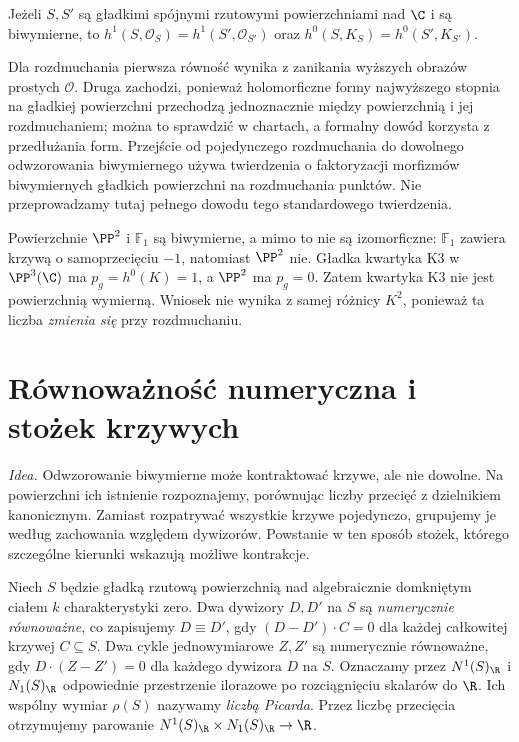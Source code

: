 \begin{twierdzenie}
\label{tw:ga8-q-pg}
Jeżeli $S,S'$ są gładkimi spójnymi rzutowymi
powierzchniami nad $\C$ i są biwymierne, to
$h^1(S,\mathcal O_S)=h^1(S',\mathcal O_{S'})$ oraz
$h^0(S,K_S)=h^0(S',K_{S'})$.
\end{twierdzenie}
\begin{uwaga}
Dla rozdmuchania pierwsza równość wynika z zanikania
wyższych obrazów prostych $\mathcal O$.
Druga zachodzi, ponieważ holomorficzne formy
najwyższego stopnia na gładkiej powierzchni
przechodzą jednoznacznie między powierzchnią i jej
rozdmuchaniem; można to sprawdzić w chartach, a
formalny dowód korzysta z przedłużania form.
Przejście od pojedynczego rozdmuchania do dowolnego
odwzorowania biwymiernego używa twierdzenia o
faktoryzacji morfizmów biwymiernych gładkich powierzchni
na rozdmuchania punktów. Nie przeprowadzamy tutaj
pełnego dowodu tego standardowego twierdzenia.
\end{uwaga}

\begin{przyklad}
Powierzchnie $\PP^2$ i $\mathbb F_1$ są biwymierne,
a mimo to nie są izomorficzne: $\mathbb F_1$ zawiera
krzywą o samoprzecięciu $-1$, natomiast $\PP^2$ nie.
Gładka kwartyka K3 w $\PP^3(\C)$ ma
$p_g=h^0(K)=1$, a $\PP^2$ ma $p_g=0$.
Zatem kwartyka K3 nie jest powierzchnią wymierną.
Wniosek nie wynika z samej różnicy $K^2$, ponieważ
ta liczba \emph{zmienia się} przy rozdmuchaniu.
\end{przyklad}

\section{Równoważność numeryczna i stożek krzywych}
\label{sec:ga8-ne-cone}

\emph{Idea.} Odwzorowanie biwymierne może kontraktować krzywe,
ale nie dowolne. Na powierzchni ich istnienie rozpoznajemy,
porównując liczby przecięć z dzielnikiem kanonicznym.
Zamiast rozpatrywać wszystkie krzywe pojedynczo, grupujemy je
według zachowania względem dywizorów. Powstanie w ten sposób
stożek, którego szczególne kierunki wskazują możliwe kontrakcje.

\begin{definicja}
\label{def:ga8-numerical}
Niech $S$ będzie gładką rzutową powierzchnią nad algebraicznie
domkniętym ciałem $k$ charakterystyki zero. Dwa dywizory
$D,D'$ na $S$ są \emph{numerycznie równoważne}, co zapisujemy
$D\equiv D'$, gdy $(D-D')\cdot C=0$ dla każdej całkowitej
krzywej $C\subseteq S$. Dwa cykle jednowymiarowe $Z,Z'$
są numerycznie równoważne, gdy $D\cdot(Z-Z')=0$ dla
każdego dywizora $D$ na $S$. Oznaczamy przez
$N^1(S)_{\R}$ i $N_1(S)_{\R}$ odpowiednie przestrzenie
ilorazowe po rozciągnięciu skalarów do $\R$.
Ich wspólny wymiar $\rho(S)$ nazywamy \emph{liczbą Picarda}.
Przez liczbę przecięcia otrzymujemy parowanie
$N^1(S)_{\R}\times N_1(S)_{\R}\to\R$.
\end{definicja}

